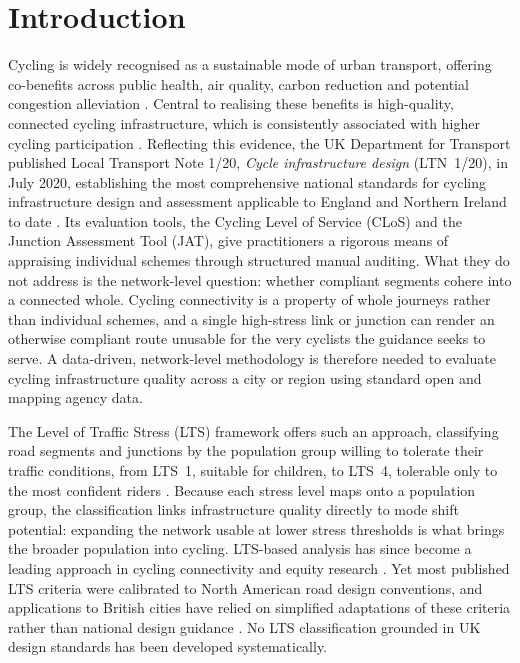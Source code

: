 \documentclass[final,5p,times,twocolumn,authoryear]{elsarticle}
\begin{document}
\section{Introduction}
\label{sec:intro}

Cycling is widely recognised as a sustainable mode of urban transport, offering co-benefits across public health, air quality, carbon reduction and potential congestion alleviation \citep{who2022, eu2024, ipcc2023}. Central to realising these benefits is high-quality, connected cycling infrastructure, which is consistently associated with higher cycling participation \citep{hull2014, buehler2016, molenberg2019}. Reflecting this evidence, the UK Department for Transport published Local Transport Note 1/20, \textit{Cycle infrastructure design} (LTN~1/20), in July 2020, establishing the most comprehensive national standards for cycling infrastructure design and assessment applicable to England and Northern Ireland to date \citep{departmentfortransport2020a}. Its evaluation tools, the Cycling Level of Service (CLoS) and the Junction Assessment Tool (JAT), give practitioners a rigorous means of appraising individual schemes through structured manual auditing. What they do not address is the network-level question: whether compliant segments cohere into a connected whole. Cycling connectivity is a property of whole journeys rather than individual schemes, and a single high-stress link or junction can render an otherwise compliant route unusable for the very cyclists the guidance seeks to serve. A data-driven, network-level methodology is therefore needed to evaluate cycling infrastructure quality across a city or region using standard open and mapping agency data.

The Level of Traffic Stress (LTS) framework offers such an approach, classifying road segments and junctions by the population group willing to tolerate their traffic conditions, from LTS~1, suitable for children, to LTS~4, tolerable only to the most confident riders \citep{mekuria2012a}. Because each stress level maps onto a population group, the classification links infrastructure quality directly to mode shift potential: expanding the network usable at lower stress thresholds is what brings the broader population into cycling. LTS-based analysis has since become a leading approach in cycling connectivity and equity research \citep{louro2026}. Yet most published LTS criteria were calibrated to North American road design conventions, and applications to British cities have relied on simplified adaptations of these criteria rather than national design guidance \citep{cervero2019, jeong2025}. No LTS classification grounded in UK design standards has been developed systematically.
\end{document}
